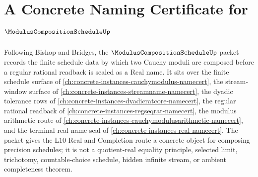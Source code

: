 \chapter{A Concrete Naming Certificate for $\ModulusCompositionScheduleUp$}
\label{ch:concrete-instances-modulus-composition-schedule-namecert}

Following Bishop and Bridges, the $\ModulusCompositionScheduleUp$ packet records the finite schedule data by which two Cauchy moduli are composed before a regular rational readback is sealed as a Real name. It sits over the finite schedule surface of \autoref{ch:concrete-instances-cauchymodulus-namecert}, the stream-window surface of \autoref{ch:concrete-instances-streamname-namecert}, the dyadic tolerance rows of \autoref{ch:concrete-instances-dyadicratcore-namecert}, the regular rational readback of \autoref{ch:concrete-instances-regseqrat-namecert}, the modulus arithmetic route of \autoref{ch:concrete-instances-cauchymodulusarithmetic-namecert}, and the terminal real-name seal of \autoref{ch:concrete-instances-real-namecert}. The packet gives the L10 Real and Completion route a concrete object for composing precision schedules; it is not a quotient-real equality principle, selected limit, trichotomy, countable-choice schedule, hidden infinite stream, or ambient completeness theorem.

